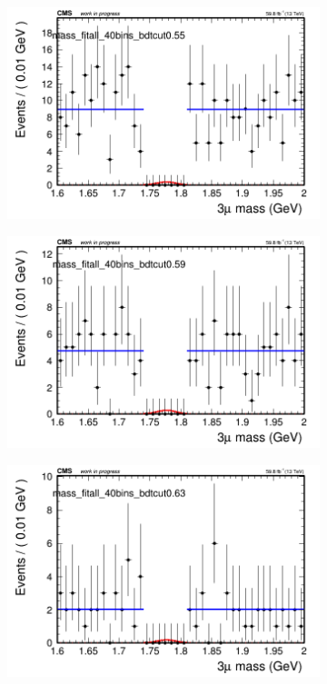 \begin{figure}[H]
\begin{subfigure}{0.2\textwidth}
        \caption{}
    \end{subfigure}
    \begin{subfigure}{0.2\textwidth}
        \includegraphics[width=\textwidth]{flat_fit/plots/all/massfit_all_40bins_bdtcut0.55.png}
        \caption{}
    \end{subfigure}
    \begin{subfigure}{0.2\textwidth}
        \includegraphics[width=\textwidth]{flat_fit/plots/all/massfit_all_40bins_bdtcut0.59.png}
        \caption{}
    \end{subfigure}
    \begin{subfigure}{0.2\textwidth}
        \includegraphics[width=\textwidth]{flat_fit/plots/all/massfit_all_40bins_bdtcut0.63.png}

\end{subfigure}
\end{figure}
